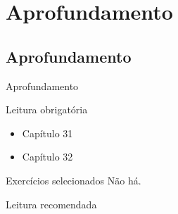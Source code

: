 \documentclass{beamer}
\begin{document}
\section{Aprofundamento}

\subsection{Aprofundamento}

\begin{frame}{Aprofundamento}
  \begin{block}{Leitura obrigatória}
    \begin{itemize}
      \footnotesize
    \item Capítulo 31
    \item Capítulo 32
    \end{itemize}
  \end{block}
  \begin{block}{Exercícios selecionados}
    \footnotesize
    Não há.
  \end{block}
  \begin{block}{Leitura recomendada}
    \small


  \end{block}
\end{frame}
\end{document}
